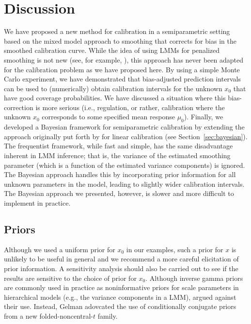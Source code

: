 \documentclass[cmfont,usenames,dvipsnames,leqno]{afit-etd}\usepackage[]{graphicx}\usepackage[]{color}
\begin{document}
\section{Discussion}
\label{sec:semipar-discussion}
We have proposed a new method for calibration in a semiparametric setting based on the mixed model approach to smoothing that corrects for bias in the smoothed calibration curve. While the idea of using \ac{LMM}s for penalized smoothing is not new (see, for example, \citet[pp. 13 - 17]{demidenko_mixed_2013}), this approach has never been adapted for the calibration problem as we have proposed here. By using a simple Monte Carlo experiment, we have demonstrated that bias-adjusted prediction intervals can be used to (numerically) obtain calibration intervals for the unknown $x_0$ that have good coverage probabilities. We have discussed a situation where this bias-correction is more serious (i.e., regulation, or rather, calibration where the unknown $x_0$ corresponds to some specified mean response $\mu_0$). Finally, we developed a Bayesian framework for semiparametric calibration by extending the approach originally put forth by \citet{hoadley_bayesian_1970} for linear calibration (see Section~\ref{sec:bayesian}). The frequentist framework, while fast and simple, has the same disadvantage inherent in \ac{LMM} inference; that is, the variance of the estimated smoothing parameter (which is a function of the estimated variance components) is ignored. The Bayesian approach handles this by incorporating prior information for all unknown parameters in the model, leading to slightly wider calibration intervals. The Bayesian approach we presented, however, is slower and more difficult to implement in practice.

\subsection{Priors}
Although we used a uniform prior for $x_0$ in our examples, such a prior for $x$ is unlikely to be useful in general and we recommend a more careful elicitation of prior information. A sensitivity analysis should also be carried out to see if the results are sensitive to the choice of prior for $x_0$. Although inverse gamma priors are commonly used in practice as noninformative priors for scale parameters in hierarchical models (e.g., the variance components in a \ac{LMM}), \citet{gelman_prior_2006} argued against their use. Instead, Gelman adovcated the use of conditionally conjugate priors from a new folded-noncentral-$t$ family.
\end{document}
